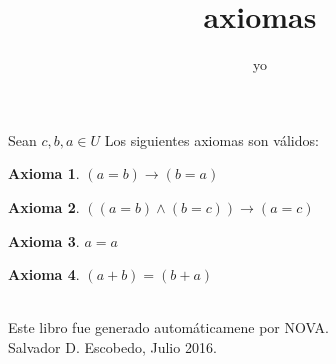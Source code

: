 ﻿\documentclass[12pt]{book}
\title{axiomas}
\author{yo}
\date{}
\newtheorem{axiom}{Axioma}[chapter]
\begin{document}
\maketitle

Sean $c,b,a\in U$
Los siguientes axiomas son válidos: 
\begin{axiom}
\item $(a=b)\rightarrow (b=a)$
\end{axiom}
\begin{axiom}
\item $((a=b)\wedge (b=c))\rightarrow (a=c)$
\end{axiom}
\begin{axiom}
\item $a=a$
\end{axiom}
\begin{axiom}
\item $(a+b)=(b+a)$
\end{axiom}
\label{ax: 0}
\\\small{Este libro fue generado automáticamene por NOVA.} \\
\small{Salvador D. Escobedo, Julio 2016}.
\end{document}
